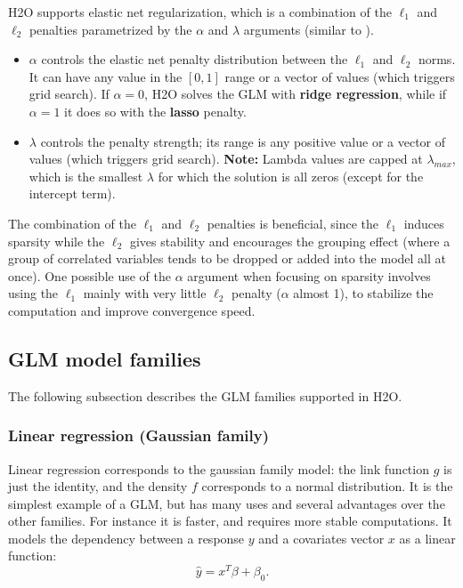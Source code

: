H2O supports elastic net regularization, which is a combination of the $\ell_1$ and $\ell_2$ penalties parametrized by the $\alpha$ and $\lambda$ arguments (similar to ).
\begin{itemize}
\item $\alpha$ controls the elastic net penalty distribution between the $\ell_1$ and $\ell_2$ norms. It can have any value
in the $[0,1]$ range or a vector of values (which triggers grid search). If $\alpha = 0$, H2O solves the GLM with \textbf{ridge regression}, while if $\alpha = 1$ it does so with the \textbf{lasso} penalty.
\item $\lambda$ controls the penalty strength; its range is any positive value or a vector of values (which triggers grid search). 
\textbf{Note:} Lambda values are capped at $\lambda_{max}$, which is the smallest $\lambda$ for which the solution is
all zeros (except for the intercept term). %
\end{itemize}


The combination of the $\ell_1$ and $\ell_2$ penalties is beneficial, since the $\ell_1$ induces sparsity while the $\ell_2$ gives
stability and encourages the grouping effect (where a group of correlated variables tends to be dropped or added
into the model all at once). One possible use of the $\alpha$ argument when focusing on sparsity involves using the $\ell_1$ mainly with very little $\ell_2$ penalty
($\alpha$ almost 1), to stabilize the computation and improve convergence speed.


\subsection{GLM model families}
The following subsection describes the GLM families supported in H2O. 

\subsubsection{Linear regression (Gaussian family)}
Linear regression corresponds to the gaussian family model: the link function $g$ is just the identity, and the density $f$ corresponds to a normal distribution. It is the simplest example of a GLM, but has many uses and
several advantages over the other families. For instance it is faster, and requires more stable computations. It models the dependency between a response $y$ and a covariates vector $x$ as a linear function:
$$ \hat{y} = x^T\beta + \beta_0.$$

